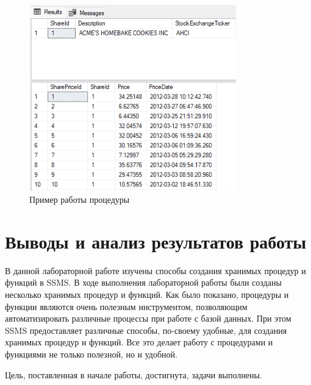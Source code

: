 \documentclass[a4paper, 14pt]{extarticle}
\begin{document}
\begin{figure}[H]
  \centering
  \includegraphics[width=0.8\textwidth]{images/task-5/3.png}
  \caption{Пример работы процедуры}
  \label{fig:task-5-3}
\end{figure}

\section{Выводы и анализ результатов работы}

В данной лабораторной работе изучены способы создания хранимых процедур и
функций в SSMS. В ходе выполнения лабораторной работы были созданы несколько
хранимых процедур и функций. Как было показано, процедуры и функции являются
очень полезным инструментом, позволяющим автоматизировать различные процессы при
работе с базой данных. При этом SSMS предоставляет различные способы, по-своему
удобные, для создания хранимых процедур и функций. Все это делает работу с
процедурами и функциями не только полезной, но и удобной.

Цель, поставленная в начале работы, достигнута, задачи выполнены.
\end{document}
